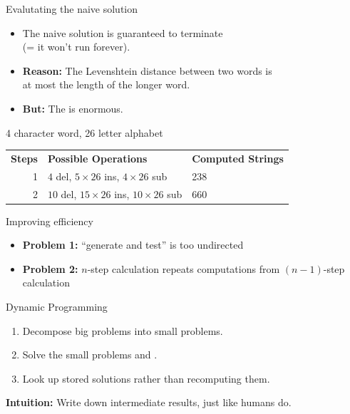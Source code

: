 \documentclass[professionalfonts, xcolor={usenames,svgnames,x11names,table}]{beamer}
\begin{document}
\begin{frame}{Evalutating the naive solution}
    \begin{itemize}
        \item The naive solution is guaranteed to terminate\\
              (= it won't run forever).
        \item \textbf{Reason:} The Levenshtein distance between two words is\\
            at most the length of the longer word.
        \item \textbf{But:} The  is enormous.
    \end{itemize}
    \begin{example}
        4 character word, 26 letter alphabet

        \medskip
        \centering
        \begin{tabular}{rll}
            \textbf{Steps} & \textbf{Possible Operations} & \textbf{Computed Strings}\\
            1 & $4$ del, $5 \times 26$ ins, $4 \times 26$ sub& 238\\
            2 & $10$ del, $15 \times 26$ ins, $10 \times 26$ sub& 660\\
        \end{tabular}
    \end{example}
\end{frame}

\begin{frame}{Improving efficiency}
    \begin{itemize}
        \item \textbf{Problem 1:} ``generate and test'' is too undirected
        \item \textbf{Problem 2:} $n$-step calculation repeats computations from $(n-1)$-step calculation
    \end{itemize}
    \begin{block}{Dynamic Programming}
        \begin{enumerate}
            \item Decompose big problems into small problems.
            \item Solve the small problems and .
            \item Look up stored solutions rather than recomputing them.
        \end{enumerate}

        \textbf{Intuition:} Write down intermediate results, just like humans do.
    \end{block}
\end{frame}
\end{document}
